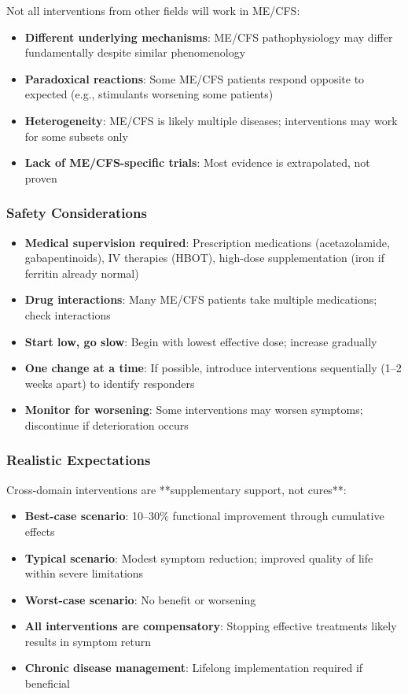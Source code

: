 Not all interventions from other fields will work in ME/CFS:

\begin{itemize}
    \item \textbf{Different underlying mechanisms}: ME/CFS pathophysiology may differ fundamentally despite similar phenomenology
    \item \textbf{Paradoxical reactions}: Some ME/CFS patients respond opposite to expected (e.g., stimulants worsening some patients)
    \item \textbf{Heterogeneity}: ME/CFS is likely multiple diseases; interventions may work for some subsets only
    \item \textbf{Lack of ME/CFS-specific trials}: Most evidence is extrapolated, not proven
\end{itemize}

\subsubsection{Safety Considerations}

\begin{itemize}
    \item \textbf{Medical supervision required}: Prescription medications (acetazolamide, gabapentinoids), IV therapies (HBOT), high-dose supplementation (iron if ferritin already normal)
    \item \textbf{Drug interactions}: Many ME/CFS patients take multiple medications; check interactions
    \item \textbf{Start low, go slow}: Begin with lowest effective dose; increase gradually
    \item \textbf{One change at a time}: If possible, introduce interventions sequentially (1--2 weeks apart) to identify responders
    \item \textbf{Monitor for worsening}: Some interventions may worsen symptoms; discontinue if deterioration occurs
\end{itemize}

\subsubsection{Realistic Expectations}

Cross-domain interventions are **supplementary support, not cures**:

\begin{itemize}
    \item \textbf{Best-case scenario}: 10--30\% functional improvement through cumulative effects
    \item \textbf{Typical scenario}: Modest symptom reduction; improved quality of life within severe limitations
    \item \textbf{Worst-case scenario}: No benefit or worsening
    \item \textbf{All interventions are compensatory}: Stopping effective treatments likely results in symptom return
    \item \textbf{Chronic disease management}: Lifelong implementation required if beneficial
\end{itemize}

